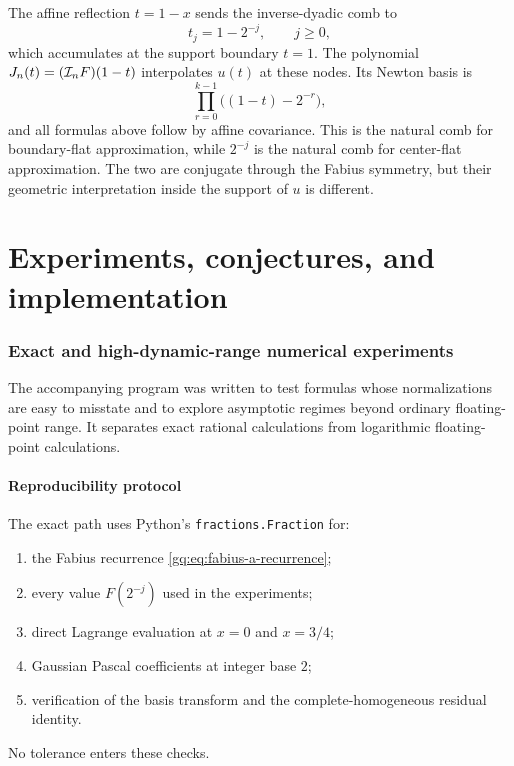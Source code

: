 The affine reflection $t=1-x$ sends the inverse-dyadic comb to
\begin{equation}
 t_j=1-2^{-j},
 \qquad j\ge0,
 \label{gq:eq:up-boundary-comb}
\end{equation}
which accumulates at the support boundary $t=1$.  The polynomial
$J_n(t)=(\mathcal I_nF)(1-t)$ interpolates $u(t)$ at these nodes.  Its Newton
basis is
\begin{equation}
 \prod_{r=0}^{k-1}\bigl((1-t)-2^{-r}\bigr),
 \label{gq:eq:reflected-newton-basis}
\end{equation}
and all formulas above follow by affine covariance.  This is the natural
comb for boundary-flat approximation, while $2^{-j}$ is the natural comb
for center-flat approximation.  The two are conjugate through the Fabius
symmetry, but their geometric interpretation inside the support of $u$ is
different.

\part{Experiments, conjectures, and implementation}

\section{Exact and high-dynamic-range numerical experiments}
\label{gq:chap:numerics}

The accompanying program
 was written to test formulas whose
normalizations are easy to misstate and to explore asymptotic regimes beyond
ordinary floating-point range.  It separates exact rational calculations
from logarithmic floating-point calculations.

\subsection{Reproducibility protocol}

The exact path uses Python's \texttt{fractions.Fraction} for:
\begin{enumerate}
\item the Fabius recurrence \eqref{gq:eq:fabius-a-recurrence};
\item every value $F(2^{-j})$ used in the experiments;
\item direct Lagrange evaluation at $x=0$ and $x=3/4$;
\item Gaussian Pascal coefficients at integer base $2$;
\item verification of the basis transform and the complete-homogeneous
      residual identity.
\end{enumerate}
No tolerance enters these checks.

